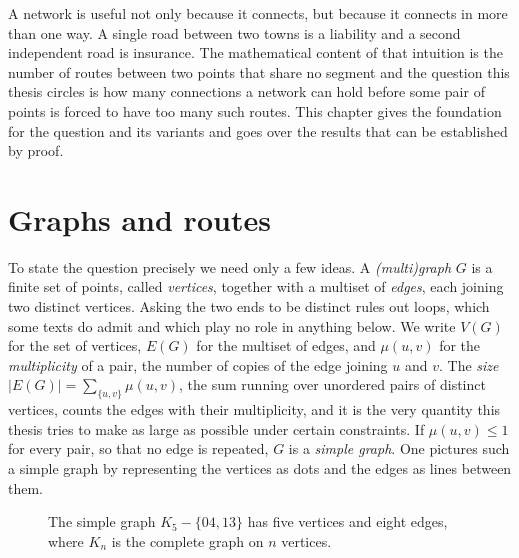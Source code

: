 A network is useful not only because it connects, but because it connects in more than one way.
A single road between two towns is a liability and a second independent road is insurance.
The mathematical content of that intuition is the number of routes between two points that share no segment and the question this thesis circles is how many connections a network can hold before some pair of points is forced to have too many such routes.
This chapter gives the foundation for the question and its variants and goes over the results that can be established by proof.

\section{Graphs and routes}

To state the question precisely we need only a few ideas.
A \emph{(multi)graph} $G$ is a finite set of points, called \emph{vertices}, together with a multiset of \emph{edges}, each joining two distinct vertices.
Asking the two ends to be distinct rules out loops, which some texts do admit and which play no role in anything below.
We write $V(G)$ for the set of vertices, $E(G)$ for the multiset of edges, and $\mu(u,v)$ for the \emph{multiplicity} of a pair, the number of copies of the edge joining $u$ and $v$.
The \emph{size} $|E(G)| = \sum_{\{u,v\}} \mu(u,v)$, the sum running over unordered pairs of distinct vertices, counts the edges with their multiplicity, and it is the very quantity this thesis tries to make as large as possible under certain constraints.
If $\mu(u,v) \le 1$ for every pair, so that no edge is repeated, $G$ is a \emph{simple graph}.
One pictures such a simple graph by representing the vertices as dots and the edges as lines between them.

\begin{figure}[ht]
\centering
{}
\caption{The simple graph $K_5-\{04,13\}$ has five vertices and eight edges, where $K_n$ is the complete graph on $n$ vertices.}
\label{fig:k5-example}
\end{figure}

